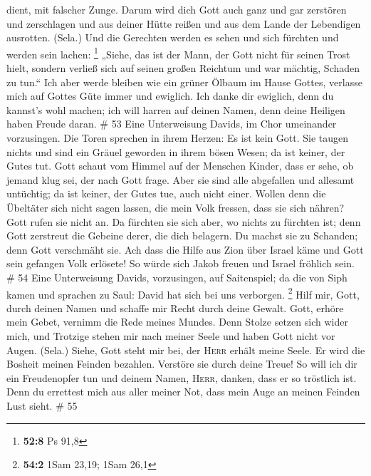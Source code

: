 dient, mit falscher Zunge.  Darum wird dich Gott auch ganz
und gar zerstören und zerschlagen und aus deiner Hütte reißen und aus
dem Lande der Lebendigen ausrotten. (Sela.)  Und die
Gerechten werden es sehen und sich fürchten und werden sein lachen:
\footnote{\textbf{52:8} Ps 91,8}  „Siehe, das ist der
Mann, der Gott nicht für seinen Trost hielt, sondern verließ sich auf
seinen großen Reichtum und war mächtig, Schaden zu tun.``
 Ich aber werde bleiben wie ein grüner Ölbaum im Hause
Gottes, verlasse mich auf Gottes Güte immer und ewiglich.
 Ich danke dir ewiglich, denn du kannst's wohl machen;
ich will harren auf deinen Namen, denn deine Heiligen haben Freude
daran. \# 53  Eine Unterweisung Davids, im Chor umeinander
vorzusingen.  Die Toren sprechen in ihrem Herzen: Es ist
kein Gott. Sie taugen nichts und sind ein Gräuel geworden in ihrem bösen
Wesen; da ist keiner, der Gutes tut.  Gott schaut vom
Himmel auf der Menschen Kinder, dass er sehe, ob jemand klug sei, der
nach Gott frage.  Aber sie sind alle abgefallen und
allesamt untüchtig; da ist keiner, der Gutes tue, auch nicht einer.
 Wollen denn die Übeltäter sich nicht sagen lassen, die
mein Volk fressen, dass sie sich nähren? Gott rufen sie nicht an.
 Da fürchten sie sich aber, wo nichts zu fürchten ist;
denn Gott zerstreut die Gebeine derer, die dich belagern. Du machst sie
zu Schanden; denn Gott verschmäht sie.  Ach dass die Hilfe
aus Zion über Israel käme und Gott sein gefangen Volk erlösete! So würde
sich Jakob freuen und Israel fröhlich sein. \# 54  Eine
Unterweisung Davids, vorzusingen, auf Saitenspiel;  da die
von Siph kamen und sprachen zu Saul: David hat sich bei uns verborgen.
\footnote{\textbf{54:2} 1Sam 23,19; 1Sam 26,1}  Hilf mir,
Gott, durch deinen Namen und schaffe mir Recht durch deine Gewalt.
 Gott, erhöre mein Gebet, vernimm die Rede meines Mundes.
 Denn Stolze setzen sich wider mich, und Trotzige stehen
mir nach meiner Seele und haben Gott nicht vor Augen. (Sela.)
 Siehe, Gott steht mir bei, der \textsc{Herr} erhält meine
Seele.  Er wird die Bosheit meinen Feinden bezahlen.
Verstöre sie durch deine Treue!  So will ich dir ein
Freudenopfer tun und deinem Namen, \textsc{Herr}, danken, dass er so
tröstlich ist.  Denn du errettest mich aus aller meiner
Not, dass mein Auge an meinen Feinden Lust sieht. \# 55 
